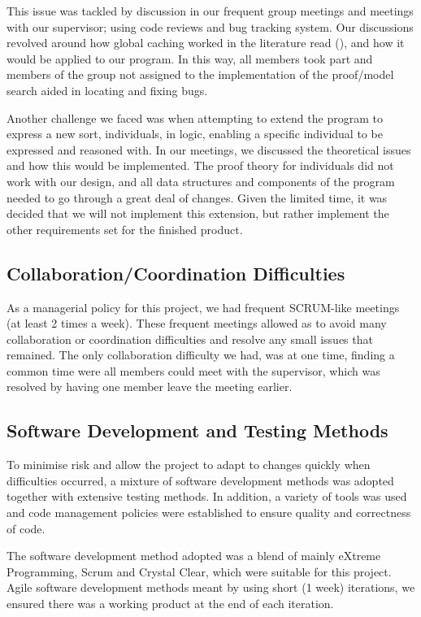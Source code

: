 This issue was tackled by discussion in our frequent group meetings and meetings with our supervisor; using code reviews and bug tracking system. Our discussions revolved around how global caching worked in the literature read (\cite{gore07, Gore:2010:OTA}), and how it would be applied to our program. In this way, all members took part and members of the group not assigned to the implementation of the proof/model search aided in locating and fixing bugs.

Another challenge we faced was when attempting to extend the program to express a new sort, individuals, in logic, enabling a specific individual to be expressed and reasoned with. In our meetings, we discussed the theoretical issues and how this would be implemented. The proof theory for individuals did not work with our design, and all data structures and components of the program needed to go through a great deal of changes. Given the limited time, it was decided that we will not implement this extension, but rather implement the other requirements set for the finished product.

\subsection{Collaboration/Coordination Difficulties}

As a managerial policy for this project, we had frequent SCRUM-like meetings (at least 2 times a week). These frequent meetings allowed as to avoid many collaboration or coordination difficulties and resolve any small issues that remained. The only collaboration difficulty we had, was at one time, finding a common time were all members could meet with the supervisor, which was resolved by having one member leave the meeting earlier.

\subsection{Software Development and Testing Methods}

To minimise risk and allow the project to adapt to changes quickly when difficulties occurred, a mixture of software development methods was adopted together with extensive testing methods. In addition, a variety of tools was used and code management policies were established to ensure quality and correctness of code.


The software development method adopted was a blend of mainly eXtreme Programming, Scrum and Crystal Clear, which were suitable for this project. Agile software development methods meant by using short (1 week) iterations, we ensured there was a working product at the end of each iteration.

